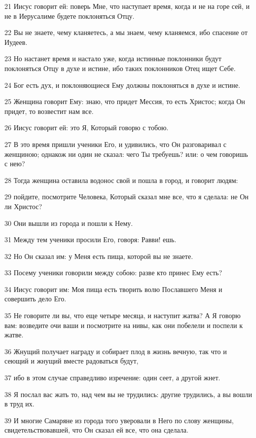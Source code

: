 \par 21 Иисус говорит ей: поверь Мне, что наступает время, когда и не на горе сей, и не в Иерусалиме будете поклоняться Отцу.
\par 22 Вы не знаете, чему кланяетесь, а мы знаем, чему кланяемся, ибо спасение от Иудеев.
\par 23 Но настанет время и настало уже, когда истинные поклонники будут поклоняться Отцу в духе и истине, ибо таких поклонников Отец ищет Себе.
\par 24 Бог есть дух, и поклоняющиеся Ему должны поклоняться в духе и истине.
\par 25 Женщина говорит Ему: знаю, что придет Мессия, то есть Христос; когда Он придет, то возвестит нам все.
\par 26 Иисус говорит ей: это Я, Который говорю с тобою.
\par 27 В это время пришли ученики Его, и удивились, что Он разговаривал с женщиною; однакож ни один не сказал: чего Ты требуешь? или: о чем говоришь с нею?
\par 28 Тогда женщина оставила водонос свой и пошла в город, и говорит людям:
\par 29 пойдите, посмотрите Человека, Который сказал мне все, что я сделала: не Он ли Христос?
\par 30 Они вышли из города и пошли к Нему.
\par 31 Между тем ученики просили Его, говоря: Равви! ешь.
\par 32 Но Он сказал им: у Меня есть пища, которой вы не знаете.
\par 33 Посему ученики говорили между собою: разве кто принес Ему есть?
\par 34 Иисус говорит им: Моя пища есть творить волю Пославшего Меня и совершить дело Его.
\par 35 Не говорите ли вы, что еще четыре месяца, и наступит жатва? А Я говорю вам: возведите очи ваши и посмотрите на нивы, как они побелели и поспели к жатве.
\par 36 Жнущий получает награду и собирает плод в жизнь вечную, так что и сеющий и жнущий вместе радоваться будут,
\par 37 ибо в этом случае справедливо изречение: один сеет, а другой жнет.
\par 38 Я послал вас жать то, над чем вы не трудились: другие трудились, а вы вошли в труд их.
\par 39 И многие Самаряне из города того уверовали в Него по слову женщины, свидетельствовавшей, что Он сказал ей все, что она сделала.
